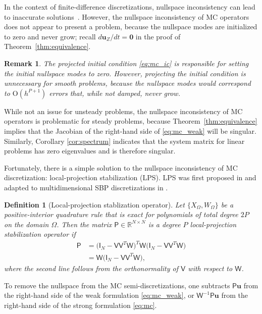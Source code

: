 \documentclass[pdflatex,sn-mathphys-num]{sn-jnl}%
\theoremstyle{thmstyleone}%
\theoremstyle{thmstyletwo}%
\newtheorem{remark}{Remark}%
\theoremstyle{thmstylethree}%
\newtheorem{definition}{Definition}%
\newcommand{\mat}[1]{\ensuremath{\mathsf{#1}}}
\begin{document}
In the context of finite-difference discretizations, nullspace inconsistency can lead to inaccurate solutions~\cite{Svard2019convergence,Glaubitz2026SBPnotenough}.  However, the nullspace inconsistency of MC operators does not appear to present a problem, because the nullspace modes are initialized to zero and never grow; recall $d \bm{u}_Z /dt = \bm{0}$ in the proof of Theorem~\ref{thm:equivalence}.

\begin{remark}
The projected initial condition \eqref{eq:mc_ic} is responsible for setting the initial nullspace modes to zero.  However, projecting the initial condition is unnecessary for smooth problems, because the nullspace modes would correspond to $\text{O}(h^{P+1})$ errors that, while not damped, never grow.
\end{remark}

While not an issue for unsteady problems, the nullspace inconsistency of MC operators is problematic for steady problems, because Theorem~\ref{thm:equivalence} implies that the Jacobian of the right-hand side of \eqref{eq:mc_weak} will be singular.  Similarly, Corollary \ref{cor:spectrum} indicates that the system matrix for linear problems has zero eigenvalues and is therefore singular.

Fortunately, there is a simple solution to the nullspace inconsistency of MC discretization: local-projection stabilization (LPS).  LPS was first proposed in \cite{Becker2001finite} and adapted to multidimensional SBP discretizations in \cite{Hicken2020entropy}.

\begin{definition}[Local-projection stablization operator]\label{def:lps}
    Let $\{ X_{\Omega}, W_{\Omega}\}$ be a positive-interior quadrature rule that is exact for polynomials of total degree $2P$ on the domain $\Omega$.  Then the matrix $\mat{P} \in \mathbb{R}^{N\times N}$ is a degree $P$ local-projection stabilization operator if 
    \begin{align*}
        \mat{P} &= \big( \mat{I}_{N} - \mat{V} \mat{V}^T \mat{W} \big)^T \mat{W} \big( \mat{I}_{N} - \mat{V} \mat{V}^T \mat{W} \big) \\
        &= \mat{W} \big( \mat{I}_{N} - \mat{V} \mat{V}^T \mat{W} \big),
    \end{align*}
    where the second line follows from the orthonormality of $\mat{V}$ with respect to $\mat{W}$.
\end{definition}

To remove the nullspace from the MC semi-discretizations, one subtracts $\mat{P} \bm{u}$ from the right-hand side of the weak formulation \eqref{eq:mc_weak}, or $\mat{W}^{-1} \mat{P} \bm{u}$ from the right-hand side of the strong formulation \eqref{eq:mc}.
\end{document}
